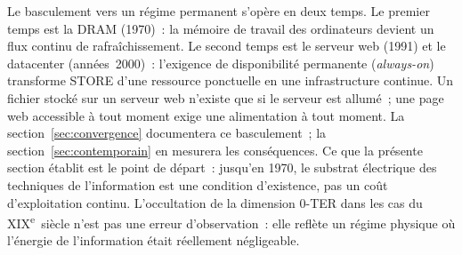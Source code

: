 %
Le basculement vers un régime permanent s'opère en deux temps. Le premier temps est la DRAM (1970)~: la mémoire de travail des ordinateurs devient un flux continu de rafraîchissement. Le second temps est le serveur web (1991) et le datacenter (années~2000)~: l'exigence de disponibilité permanente (\emph{always-on}) transforme STORE d'une ressource ponctuelle en une infrastructure continue. Un fichier stocké sur un serveur web n'existe que si le serveur est allumé~; une page web accessible à tout moment exige une alimentation à tout moment. La section~\ref{sec:convergence} documentera ce basculement~; la section~\ref{sec:contemporain} en mesurera les conséquences. Ce que la présente section établit est le point de départ~: jusqu'en 1970, le substrat électrique des techniques de l'information est une condition d'existence, pas un coût d'exploitation continu. L'occultation de la dimension 0-TER dans les cas du XIX\textsuperscript{e}~siècle n'est pas une erreur d'observation~: elle reflète un régime physique où l'énergie de l'information était réellement négligeable.




